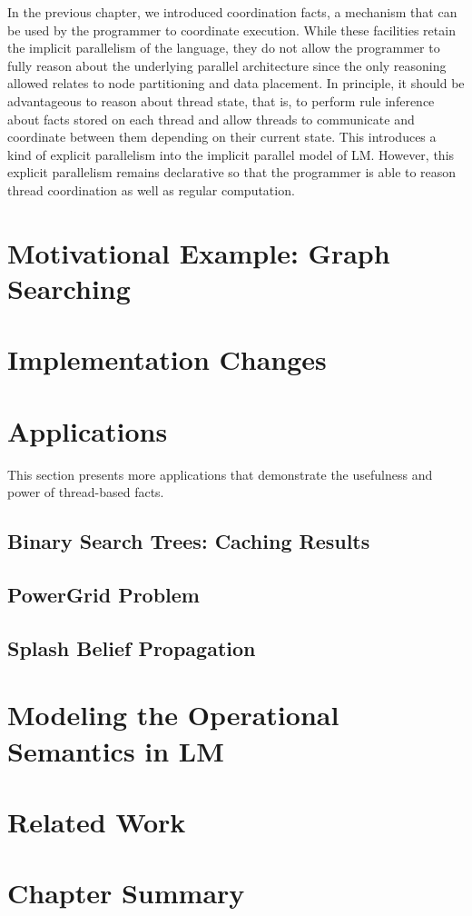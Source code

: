 In the previous chapter, we introduced coordination facts, a mechanism that can
be used by the programmer to coordinate execution. While these facilities retain
the implicit parallelism of the language, they do not allow the programmer to
fully reason about the underlying parallel architecture since the only reasoning
allowed relates to node partitioning and data placement. In principle, it should
be advantageous to reason about thread state, that is, to perform rule inference
about facts stored on each thread and allow threads to communicate and
coordinate between them depending on their current state. This introduces a kind
of explicit parallelism into the implicit parallel model of LM.  However, this
explicit parallelism remains declarative so that the programmer is able to
reason thread coordination as well as regular computation.

\section{Motivational Example: Graph Searching}


\section{Implementation Changes}


\section{Applications}

This section presents more applications that demonstrate the usefulness and
power of thread-based facts.

\subsection{Binary Search Trees: Caching Results}


\subsection{PowerGrid Problem}


\subsection{Splash Belief Propagation}\label{sec:coordination:bp}


\section{Modeling the Operational Semantics in LM}


\section{Related Work}


\section{Chapter Summary}

